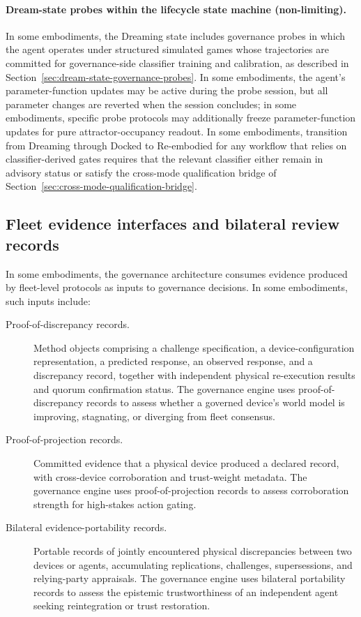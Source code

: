 \documentclass[a4paper,12pt]{article}
\begin{document}
\paragraph{Dream-state probes within the lifecycle state machine
(non-limiting).}
In some embodiments, the Dreaming state includes governance probes in
which the agent operates under structured simulated games whose
trajectories are committed for governance-side classifier training and
calibration, as described in
Section~\ref{sec:dream-state-governance-probes}. In some embodiments,
the agent's parameter-function updates may be active during the probe
session, but all parameter changes are reverted when the session
concludes; in some embodiments, specific probe protocols may
additionally freeze parameter-function updates for pure
attractor-occupancy readout. In some
embodiments, transition from Dreaming through Docked to Re-embodied for any workflow
that relies on classifier-derived gates requires that the relevant
classifier either remain in advisory status or satisfy the cross-mode
qualification bridge of
Section~\ref{sec:cross-mode-qualification-bridge}.
\subsection{Fleet evidence interfaces and bilateral review records}
\label{sec:fleet-interface}

In some embodiments, the governance architecture consumes evidence
produced by fleet-level protocols as inputs to governance decisions.
In some embodiments, such inputs include:

\begin{description}
  \item[Proof-of-discrepancy records.] Method objects comprising
    a challenge specification, a device-configuration representation,
    a predicted response, an observed response, and a discrepancy
    record, together with independent physical re-execution results and
    quorum confirmation status. The governance engine uses
    proof-of-discrepancy records to assess whether a governed device's
    world model is improving, stagnating, or diverging from fleet
    consensus.
  \item[Proof-of-projection records.] Committed evidence that a
    physical device produced a declared record, with cross-device
    corroboration and trust-weight metadata. The governance engine
    uses proof-of-projection records to assess corroboration strength
    for high-stakes action gating.
  \item[Bilateral evidence-portability records.] Portable records of
    jointly encountered physical discrepancies between two devices or
    agents, accumulating replications, challenges, supersessions, and
    relying-party appraisals. The governance engine uses bilateral
    portability records to assess the epistemic trustworthiness of
    an independent agent seeking reintegration or trust restoration.
\end{description}
\end{document}

